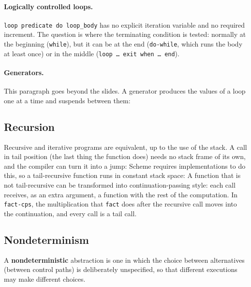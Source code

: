 \paragraph{Logically controlled loops.} \texttt{loop predicate do loop\_body} has no
explicit iteration variable and no required increment. The question is where
the terminating condition is tested: normally at the beginning
(\texttt{while}), but it can be at the end (\texttt{do-while}, which runs the
body at least once) or in the middle (\texttt{loop \dots{} exit when \dots{} end}).

\paragraph{Generators.} This paragraph goes beyond the slides. A generator
produces the values of a loop one at a time and suspends between them:

\subsection{Recursion}

Recursive and iterative programs are equivalent, up to the use of the stack.
A call in tail position (the last thing the function does) needs no stack
frame of its own, and the compiler can turn it into a jump:
Scheme requires implementations to do this, so a tail-recursive function runs
in constant stack space:
A function that is not tail-recursive can be transformed into
continuation-passing style: each call receives, as an extra argument, a
function with the rest of the computation.
In \texttt{fact-cps}, the multiplication that \texttt{fact} does after the
recursive call moves into the continuation, and every call is a tail call.

\subsection{Nondeterminism}

\begin{definition}
A \textbf{nondeterministic} abstraction is one in which the choice between
alternatives (between control paths) is deliberately unspecified, so that
different executions may make different choices.
\end{definition}

